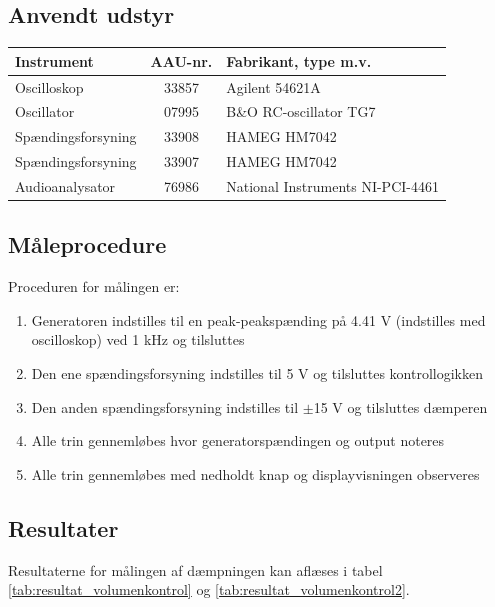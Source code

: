 \subsection*{Anvendt udstyr}

\begin{table}[h]
\centering
\begin{tabular}{l|c|l}
\hline\hline
Instrument & AAU-nr. & Fabrikant, type m.v. \\
\hline\hline
Oscilloskop & 33857 & Agilent 54621A \\[4pt]
Oscillator & 07995 & B\&O RC-oscillator TG7 \\[4pt]
Spændingsforsyning & 33908 & HAMEG HM7042 \\[4pt]
Spændingsforsyning & 33907 & HAMEG HM7042 \\[4pt]
Audioanalysator & 76986 & National Instruments NI-PCI-4461 \\
\hline\hline
\end{tabular}
\label{tab:maaleudstyr_forforstaerker}
\end{table}

\subsection*{Måleprocedure}
Proceduren for målingen er:

\begin{enumerate}
\item Generatoren indstilles til en peak-peakspænding på 4.41 V (indstilles med oscilloskop) ved 1 kHz og tilsluttes
\item Den ene spændingsforsyning indstilles til 5 V og tilsluttes kontrollogikken
\item Den anden spændingsforsyning indstilles til $\pm$15 V og tilsluttes dæmperen
\item Alle trin gennemløbes hvor generatorspændingen og output noteres
\item Alle trin gennemløbes med nedholdt knap og displayvisningen observeres
\end{enumerate}

\subsection*{Resultater}

Resultaterne for målingen af dæmpningen kan aflæses i tabel \ref{tab:resultat_volumenkontrol} og \ref{tab:resultat_volumenkontrol2}.

